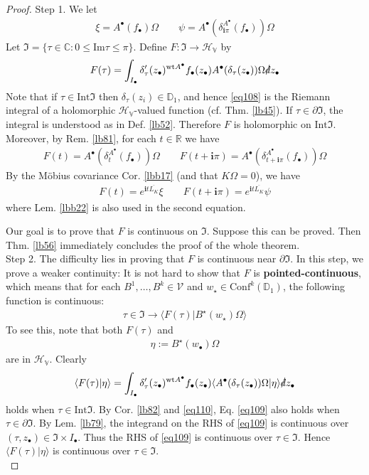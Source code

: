 \documentclass[12pt,b5paper,notitlepage]{article}
\theoremstyle{definition}
\theoremstyle{plain}
\newcommand{\fk}{\mathfrak}
\newcommand{\ovl}{\overline}
\newcommand{\Conf}{\mathrm{Conf}}
\newcommand{\bk}[1]{\langle {#1}\rangle}
\newcommand{\im}{\mathbf{i}}
\newcommand{\blt}{\bullet}
\newcommand{\Cbb}{\mathbb C}
\newcommand{\Rbb}{\mathbb R}
\newcommand{\Dbb}{\mathbb D}
\newcommand{\wt}{\mathrm{wt}}
\newcommand{\Imag}{\mathrm{Im}}
\newcommand{\Int}{\mathrm{Int}}
\newcommand{\HV}{\mathcal H_{\mathbb V}}
\newcommand{\sd}{\slashed{d}}
\newcommand{\MV}{\mathcal V}
\numberwithin{equation}{section}
\begin{document}
\begin{proof}
Step 1. We let
\begin{align*}
\xi=A^\blt(f_\blt)\Omega\qquad \psi=A^\blt(\delta_{\im\pi}^{A^\blt}(f_\blt))\Omega
\end{align*}
Let $\fk I=\{\tau\in\Cbb:0\leq\Imag\tau\leq\pi\}$. Define $F:\fk I\rightarrow\HV$ by
\begin{gather}\label{eq108}
F(\tau)=\int_{I_\blt}\delta'_\tau(z_\blt)^{\wt A^\blt}f_\blt(z_\blt)A^\blt(\delta_\tau(z_\blt))\Omega\sd z_\blt
\end{gather}
Note that if $\tau\in\Int\fk I$ then $\delta_\tau(z_i)\in\Dbb_1$, and hence \eqref{eq108} is the Riemann integral of a holomorphic $\HV$-valued function (cf. Thm. \ref{lb45}). If $\tau\in\partial\fk I$, the integral is understood as in Def. \ref{lb52}. Therefore $F$ is holomorphic on $\Int\fk I$. Moreover, by Rem. \ref{lb81}, for each $t\in\Rbb$ we have
\begin{gather}\label{eq110}
F(t)=A^\blt(\delta_t^{A^\blt}(f_\blt))\Omega\qquad F(t+\im\pi)=A^\blt(\delta_{t+\im\pi}^{A^\blt}(f_\blt))\Omega
\end{gather}
By the M\"obius covariance Cor. \ref{lbb17} (and that $K\Omega=0$), we have
\begin{align}\label{eq111}
F(t)=e^{\im t\ovl{L_K}}\xi\qquad F(t+\im\pi)=e^{\im t\ovl{L_K}}\psi
\end{align}
where Lem. \ref{lbb22} is also used in the second equation.

Our goal is to prove that $F$ is continuous on $\fk I$. Suppose this can be proved. Then Thm. \ref{lb56} immediately concludes the proof of the whole theorem.\\[-1ex]

Step 2. The difficulty lies in proving that $F$ is continuous near $\partial\fk I$. In this step, we prove a weaker continuity: It is not hard to show that $F$ is \textbf{pointed-continuous}, which means that for each $B^1,\dots,B^k\in\MV$ and $w_\star\in\Conf^k(\Dbb_1)$, the following function is continuous:
\begin{align*}
\tau\in\fk I\rightarrow \bk{F(\tau)|B^\star(w_\star)\Omega}
\end{align*}
To see this, note that both $F(\tau)$ and
\begin{align}\label{eq112}
\eta:=B^\star(w_\blt)\Omega
\end{align}
are in $\HV$. Clearly
\begin{align}\label{eq109}
\bk{F(\tau)|\eta}=\int_{I_\blt}\delta'_\tau(z_\blt)^{\wt A^\blt}f_\blt(z_\blt)\bk{A^\blt(\delta_\tau(z_\blt))\Omega|\eta}\sd z_\blt
\end{align}
holds when $\tau\in\Int\fk I$. By Cor. \ref{lb82} and \eqref{eq110}, Eq. \eqref{eq109} also holds when $\tau\in\partial\fk I$. By Lem. \ref{lb79}, the integrand on the RHS of \eqref{eq109} is continuous over $(\tau,z_\blt)\in\fk I\times I_\blt$. Thus the RHS of \eqref{eq109} is continuous over $\tau\in\fk I$. Hence $\bk{F(\tau)|\eta}$ is continuous over $\tau\in\fk I$.\\[-1ex]



\end{proof}
\end{document}
